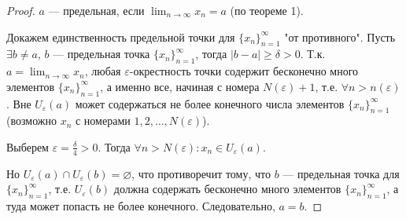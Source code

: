 \documentclass[a4paper,12pt]{article} %
\theoremstyle{remark}
\begin{document}
\begin{proof}
	$a$ --- предельная, если $\lim_{n \to \infty} x_n = a$ (по теореме 1).

Докажем единственность предельной точки для $\{x_n\}_{n=1}^{\infty}$ "от противного". Пусть $\exists b\neq a$, $b$ --- предельная точка $\{x_n\}_{n=1}^{\infty}$, тогда $|b-a|\ge \delta>0$. Т.к. $a=\lim_{n \to \infty} x_n$, любая $\varepsilon$-окрестность точки содержит бесконечно много элементов $\{x_n\}_{n=1}^{\infty}$, а именно все, начиная с номера $N(\varepsilon) + 1$, т.е. $\forall n>n(\varepsilon)$. Вне $U_\varepsilon(a)$ может содержаться не более конечного числа элементов $\{x_n\}_{n=1}^{\infty}$ (возможно $x_n$ с номерами $1, 2, \ldots, N(\varepsilon)$).

Выберем $\varepsilon=\frac{\delta}{4} > 0$. Тогда $\forall n>N(\varepsilon) : x_n \in  U_\varepsilon(a)$. 

\begin{center}
\end{center}

Но $U_\varepsilon(a)\cap U_\varepsilon(b) = \varnothing$, что противоречит тому, что $b$ --- предельная точка для $\{x_n\}_{n=1}^{\infty}$, т.е. $U_\varepsilon(b)$ должна содержать бесконечно много элементов $\{x_n\}_{n=1}^{\infty}$, а туда может попасть не более конечного. Следовательно, $a = b$.
\end{proof}
\end{document}
